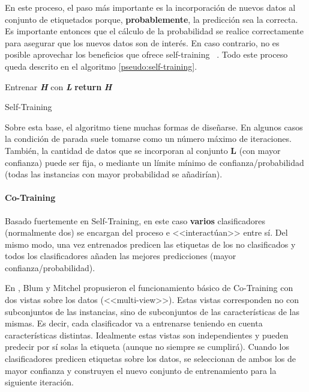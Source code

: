 En este proceso, el paso más importante es la incorporación de nuevos datos al
conjunto de etiquetados porque, \textbf{probablemente}, la predicción sea la
correcta. Es importante entonces que el cálculo de la probabilidad se realice
correctamente para asegurar que los nuevos datos son de interés. En caso
contrario, no es posible aprovechar los beneficios que ofrece self-training~
\cite{vanEngelen2020}. Todo este proceso queda descrito en el algoritmo
\ref{pseudo:self-training}.

\begin{algorithm}
    \DontPrintSemicolon
     Entrenar \textbf{\textit{H}} con \textbf{\textit{L}}\;
     \textbf{return} \textbf{\textit{H}}
     \caption{Self-Training}\label{pseudo:self-training}
\end{algorithm}

Sobre esta base, el algoritmo tiene muchas formas de diseñarse. En algunos casos
la condición de parada suele tomarse como un número máximo de iteraciones.
También, la cantidad de datos que se incorporan al conjunto \textbf{L} (con
mayor confianza) puede ser fija, o mediante un límite mínimo de
confianza/probabilidad (todas las instancias con mayor probabilidad se
añadirían).

\paragraph{Co-Training}
Basado fuertemente en Self-Training, en este caso \textbf{varios} clasificadores
(normalmente dos) se encargan del proceso e <<interactúan>> entre sí. Del mismo
modo, una vez entrenados predicen las etiquetas de los no clasificados y todos
los clasificadores añaden las mejores predicciones (mayor
confianza/probabilidad).

En \cite{blum1998combining}, Blum y Mitchel propusieron el funcionamiento básico
de Co-Training con dos vistas sobre los datos (<<multi-view>>). Estas vistas
corresponden no con subconjuntos de las instancias, sino de subconjuntos de las
características de las mismas. Es decir, cada clasificador va a entrenarse
teniendo en cuenta características distintas. Idealmente estas vistas son
independientes y pueden predecir por sí solas la etiqueta (aunque no siempre se
cumplirá). Cuando los clasificadores predicen etiquetas sobre los datos, se
seleccionan de ambos los de mayor confianza y construyen el nuevo conjunto de
entrenamiento para la siguiente iteración.


